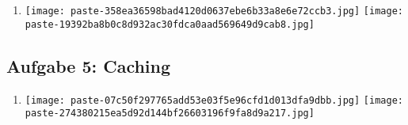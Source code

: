 \documentclass[12pt,a4paper]{article}
\begin{document}
\begin{enumerate}[label=\alph*), topsep=5pt, itemsep=10pt]
\item \mbox{}\begin{center}\texttt{[image: paste-358ea36598bad4120d0637ebe6b33a8e6e72ccb3.jpg]}
\texttt{[image: paste-19392ba8b0c8d932ac30fdca0aad569649d9cab8.jpg]}
\end{center}
\end{enumerate}
\clearpage
\subsection*{Aufgabe 5: Caching}

\begin{enumerate}[label=\alph*), topsep=5pt, itemsep=10pt]
\item \mbox{}\begin{center}\texttt{[image: paste-07c50f297765add53e03f5e96cfd1d013dfa9dbb.jpg]}
\texttt{[image: paste-274380215ea5d92d144bf26603196f9fa8d9a217.jpg]}
\end{center}
\end{enumerate}
\clearpage
\end{document}
